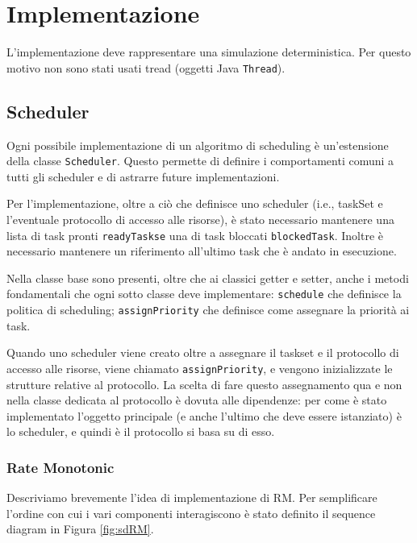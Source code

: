 \chapter{Implementazione}

L'implementazione deve rappresentare una simulazione deterministica. Per questo motivo non sono stati usati tread (oggetti Java \texttt{Thread}).

\section{Scheduler}
Ogni possibile implementazione di un algoritmo di scheduling è un'estensione della classe \texttt{Scheduler}. Questo permette di definire i comportamenti comuni a tutti gli scheduler e di astrarre future implementazioni.

Per l'implementazione, oltre a ciò che definisce uno scheduler (i.e., taskSet e l'eventuale protocollo di accesso alle risorse), è stato necessario mantenere una lista di task pronti \texttt{readyTaskse} una di task bloccati \texttt{blockedTask}. Inoltre è necessario mantenere un riferimento all'ultimo task che è andato in esecuzione.

\myskip

Nella classe base sono presenti, oltre che ai classici getter e setter, anche i metodi fondamentali che ogni sotto classe deve implementare: \texttt{schedule} che definisce la politica di scheduling; \texttt{assignPriority} che definisce come assegnare la priorità ai task.

Quando uno scheduler viene creato oltre a assegnare il taskset e il protocollo di accesso alle risorse, viene chiamato \texttt{assignPriority}, e vengono inizializzate le strutture relative al protocollo. La scelta di fare questo assegnamento qua e non nella classe dedicata al protocollo è dovuta alle dipendenze: per come è stato implementato l'oggetto principale (e anche l'ultimo che deve essere istanziato) è lo scheduler, e quindi è il protocollo si basa su di esso.

\subsection{Rate Monotonic}
Descriviamo brevemente l'idea di implementazione di RM. Per semplificare l'ordine con cui i vari componenti interagiscono è stato definito il sequence diagram in Figura \ref{fig:sdRM}.

\myskip

